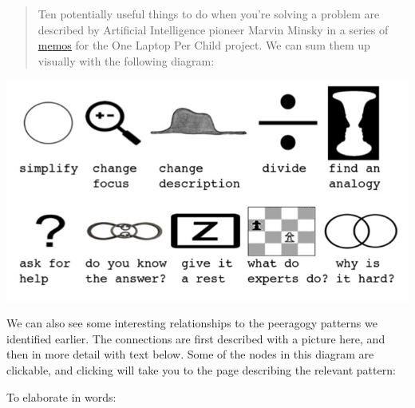 \begin{quote}
Ten potentially useful things to do when you're solving a problem are
described by Artificial Intelligence pioneer Marvin Minsky in a series
of
\href{http://web.media.mit.edu/~minsky/OLPC-1.html}{m}\href{http://web.media.mit.edu/~minsky/OLPC-2.html}{e}\href{http://web.media.mit.edu/~minsky/OLPC-3.html}{m}\href{http://web.media.mit.edu/~minsky/OLPC-4.html}{o}\href{http://web.media.mit.edu/~minsky/OLPC-5.html}{s}
for the One Laptop Per Child project. We can sum them up visually with
the following diagram:
\end{quote}

\begin{center}
\includegraphics[width=\textwidth]{../pictures/heuristic-images.jpg}
\end{center}
We can also see some interesting relationships to the peeragogy patterns
we identified earlier. The connections are first described with a
picture here, and then in more detail with text below. Some of the nodes
in this diagram are clickable, and clicking will take you to the page
describing the relevant pattern:

To elaborate in words:

